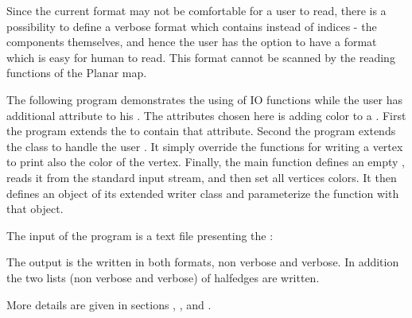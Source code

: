\begin{ccAdvanced}
Since the current format may not be comfortable for a user to read, there is a possibility to define a verbose format which contains instead of 
indices - the components themselves, and hence the user has the option to have a format which is easy for human to read.
This format cannot be scanned by the reading functions of the Planar map.

\ccExample
\label{PM_sec:example10}

The following program demonstrates the using of IO functions while the user has additional attribute to his .
The attributes chosen here is adding color to a .
First the program extends the  to contain that attribute.
Second the program extends the  class to handle the user . It simply override the functions for 
writing a vertex to print also the color of the vertex. Finally, the main function defines an empty ,  
reads it from the standard input stream, and then set all vertices colors. It then defines an object of its extended writer class and 
parameterize the function  with that object.


The input of the program is a text file presenting the :

The output is the  written in both formats, non verbose and verbose. In addition the two lists 
(non verbose and verbose) of halfedges are written.

More details are given in sections
,
, 
 and
.

\end{ccAdvanced}


